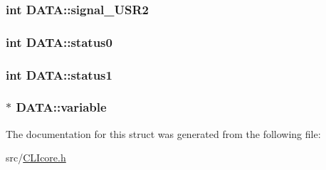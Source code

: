 \hypertarget{structDATA_a2be71623c71eb07003ff60f14240b31a}{
\subsubsection[{signal\+\_\+\+U\+S\+R2}]{\setlength{\rightskip}{0pt plus 5cm}int D\+A\+T\+A\+::signal\+\_\+\+U\+S\+R2}}\label{structDATA_a2be71623c71eb07003ff60f14240b31a}
\hypertarget{structDATA_a14eafa363f5cd5dd7ff9ca0744029565}{
\subsubsection[{status0}]{\setlength{\rightskip}{0pt plus 5cm}int D\+A\+T\+A\+::status0}}\label{structDATA_a14eafa363f5cd5dd7ff9ca0744029565}
\hypertarget{structDATA_acc1a46fa384934e24a89660d8d0c9f7a}{
\subsubsection[{status1}]{\setlength{\rightskip}{0pt plus 5cm}int D\+A\+T\+A\+::status1}}\label{structDATA_acc1a46fa384934e24a89660d8d0c9f7a}
\hypertarget{structDATA_a38336f0ef793c2aef2a6f3a20e3e361b}{
\subsubsection[{variable}]{$\ast$ D\+A\+T\+A\+::variable}}\label{structDATA_a38336f0ef793c2aef2a6f3a20e3e361b}


The documentation for this struct was generated from the following file\+:\begin{DoxyCompactItemize}
\item 
src/\hyperlink{CLIcore_8h}{C\+L\+Icore.\+h}\end{DoxyCompactItemize}
